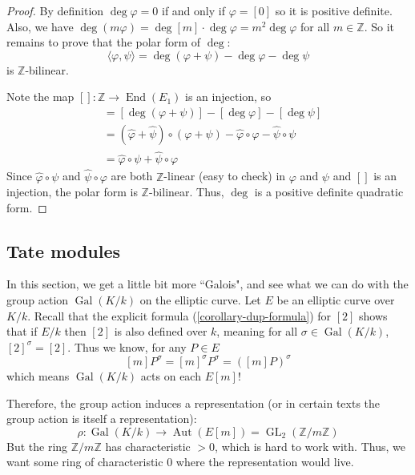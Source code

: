 \documentclass[12pt]{article}
\theoremstyle{remark}
\theoremstyle{definition}
\newcommand{\s}[0]{\sigma}
\newcommand{\Z}[0]{\mathbb{Z}}
\newcommand{\Aut}[0]{\operatorname{Aut}}
\newcommand{\Gal}[0]{\operatorname{Gal}}
\newcommand{\End}[0]{\operatorname{End}}
\begin{document}
    \begin{proof}
        By definition $\deg\varphi=0$ if and only if $\varphi=[0]$ so it is positive definite. Also, we have $\deg(m\varphi)=\deg[m]\cdot\deg\varphi=m^2\deg\varphi$ for all $m\in\Z$. So it remains to prove that the polar form of $\deg$:
        \[\langle\varphi,\psi\rangle=\deg(\varphi+\psi)-\deg\varphi-\deg\psi\]
        is $\Z$-bilinear. 
        
        Note the map $[]:\Z\to\End(E_1)$ is an injection, so
        \begin{align*}
            [\langle\varphi,\psi\rangle]&=[\deg(\varphi+\psi)]-[\deg\varphi]-[\deg\psi]\\
            &=(\hat\varphi+\hat\psi)\circ(\varphi+\psi)-\hat\varphi\circ\varphi-\hat\psi\circ\psi\\
            &=\hat\varphi\circ\psi+\hat\psi\circ\varphi
        \end{align*}
        Since $\hat\varphi\circ\psi$ and $\hat\psi\circ\varphi$ are both $\Z$-linear (easy to check) in $\varphi$ and $\psi$ and $[]$ is an injection, the polar form is $\Z$-bilinear. Thus, $\deg$ is a positive definite quadratic form. 
    \end{proof}
    \subsection{Tate modules}
        In this section, we get a little bit more ``Galois", and see what we can do with the group action $\Gal(K/k)$ on the elliptic curve. Let $E$ be an elliptic curve over $K/k$. Recall that the explicit formula (\autoref{corollary-dup-formula}) for $[2]$ shows that if $E/k$ then $[2]$ is also defined over $k$, meaning for all $\s\in\Gal(K/k)$, $[2]^\s=[2]$. Thus we know, for any $P\in E$
        \[[m]P^\s=[m]^\s P^\s=([m]P)^\s\]
        which means $\Gal(K/k)$ acts on each $E[m]$!
        
        Therefore, the group action induces a representation (or in certain texts the group action is itself a representation):
        \[\rho:\Gal(K/k)\to\Aut(E[m])=\operatorname{GL}_2(\Z/m\Z)\]
        But the ring $\Z/m\Z$ has characteristic $>0$, which is hard to work with. Thus, we want some ring of characteristic $0$ where the representation would live.
        
\end{document}
